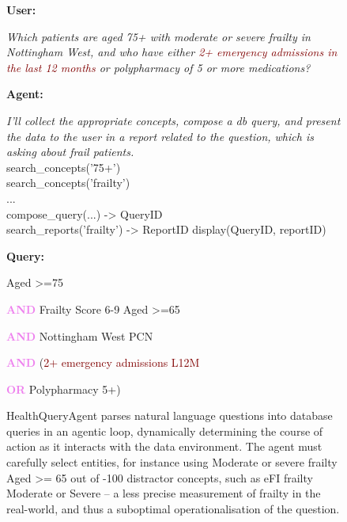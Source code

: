\documentclass[11pt]{article}
\begin{document}
\begin{figure}[h!]

\textbf{User:}

{\leftskip 0.6cm

\textit{Which patients are \textcolor{Cerulean}{aged 75+} with \textcolor{Rhodamine}{moderate or severe frailty} in \textcolor{OliveGreen}{Nottingham West}, and who have either \textcolor{Maroon}{2+ emergency admissions in the last 12 months} or \textcolor{PineGreen}{polypharmacy of 5 or more medications?}} \\

}

\textbf{Agent:}

{\leftskip 0.6cm

	\textit{I'll collect the appropriate concepts, compose a db query, and present the data to the user in a report related to the question, which is asking about frail patients.} \\

	\ttfamily
	search\_concepts('75+') \\
	search\_concepts('frailty') \\
	... \\ %
	compose\_query(...) -> QueryID \\
	search\_reports('frailty') -> ReportID
	display(QueryID, reportID) \\
\par
}

\textbf{Query:}

{\leftskip 0.6cm

	\textcolor{Cerulean}{Aged >=75}

	\textbf{\textcolor{Violet}{AND}} \textcolor{Rhodamine}{Frailty Score 6-9 Aged >=65}
	
	\textbf{\textcolor{Violet}{AND}} \textcolor{OliveGreen}{Nottingham West PCN}
	
	\textbf{\textcolor{Violet}{AND}}  (\textcolor{Maroon}{2+ emergency admissions L12M}
	
	\hspace{2cm}	\textbf{\textcolor{Violet}{OR}}  \textcolor{PineGreen}{Polypharmacy 5+})
}
\caption{
	HealthQueryAgent parses natural language questions into database queries in an agentic loop, dynamically determining the course of action as it interacts with the data environment.
	The agent must carefully select entities, for instance using \textcolor{Rhodamine}{Moderate or severe frailty Aged >= 65} out of -100 %
	distractor concepts, such as \textcolor{BrickRed}{eFI frailty Moderate or Severe} -- a less precise measurement of frailty in the real-world, and thus a suboptimal operationalisation of the question.
}
\end{figure}
\end{document}
